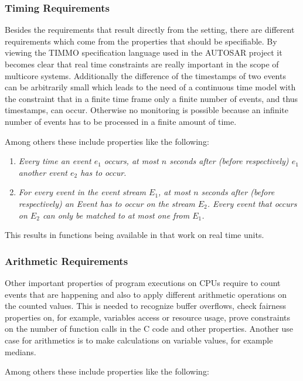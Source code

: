 \subsubsection{Timing Requirements}

Besides the requirements that result directly from the setting, there are different requirements which come from the properties that should be specifiable. By viewing the TIMMO specification language used in the AUTOSAR project it becomes clear that real time constraints are really important in the scope of multicore systems. Additionally the difference of the timestamps of two events can be arbitrarily small which leads to the need of a continuous time model with the constraint that in a finite time frame only a finite number of events, and thus timestamps, can occur. Otherwise no monitoring is possible because an infinite number of events has to be processed in a finite amount of time.

Among others these include properties like the following:

\begin{enumerate}
	\item \textit{Every time an event $e_1$ occurs, at most $n$ seconds after (before respectively) $e_1$ another event $e_2$ has to occur.}
	\item \textit{For every event in the event stream $E_1$, at most $n$ seconds after (before respectively) an Event has to occur on the stream $E_2$. Every event that occurs on $E_2$ can only be matched to at most one from $E_1$.}
\end{enumerate}

This results in functions being available in \tessla that work on real time units.

\subsubsection{Arithmetic Requirements}

Other important properties of program executions on CPUs require to count events that are happening and also to apply different arithmetic operations on the counted values. This is needed to recognize buffer overflows, check fairness properties on, for example, variables access or resource usage, prove constraints on the number of function calls in the C code and other properties. Another use case for arithmetics is to make calculations on variable values, for example medians.

Among others these include properties like the following:

